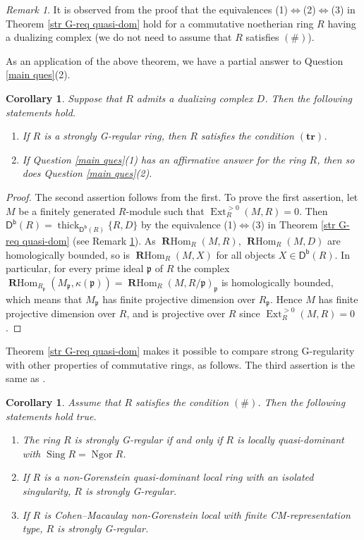\documentclass{amsart}
\newtheorem{cor}[thm]{Corollary}
\theoremstyle{definition}
\theoremstyle{remark}
\newtheorem{rem}[thm]{Remark}
\numberwithin{equation}{thm}
\def\Db{\operatorname{\mathsf{D^b}}}
\def\Ext{\operatorname{Ext}}
\def\ng{\operatorname{Ngor}}
\def\p{\mathfrak{p}}
\def\RHom{\operatorname{\mathbf{R}Hom}}
\def\sing{\operatorname{Sing}}
\def\thick{\operatorname{thick}}
\def\TR{(\mathbf{tr})}
\begin{document}
\begin{rem}\label{12}
It is observed from the proof that the equivalences (1)$\Leftrightarrow$(2)$\Leftrightarrow$(3) in Theorem \ref{str G-req quasi-dom} hold for a commutative noetherian ring $R$ having a dualizing complex (we do not need to assume that $R$ satisfies $(\#)$).
\end{rem}

As an application of the above theorem, we have a partial answer to Question \ref{main ques}(2).

\begin{cor}\label{stgregtr}
Suppose that $R$ admits a dualizing complex $D$.
Then the following statements hold.
\begin{enumerate}[\rm(1)]
\item
If $R$ is a strongly G-regular ring, then $R$ satisfies the condition $\TR$.
\item
If Question \ref{main ques}(1) has an affirmative answer for the ring $R$, then so does Question \ref{main ques}(2).
\end{enumerate}
\end{cor}

\begin{proof}
The second assertion follows from the first.
To prove the first assertion, let $M$ be a finitely generated $R$-module such that $\Ext_R^{>0}(M,R)=0$.
Then $\Db(R)=\thick_{\Db(R)} \{R, D\}$ by the equivalence (1)$\Leftrightarrow$(3) in Theorem \ref{str G-req quasi-dom} (see Remark \ref{12}).
As $\RHom_R(M,R)$, $\RHom_R(M,D)$ are homologically bounded, so is $\RHom_R(M,X)$ for all objects $X\in\Db(R)$.
In particular, for every prime ideal $\p$ of $R$ the complex $\RHom_{R_\p}(M_\p, \kappa(\p))=\RHom_R(M,R/\p)_\p$ is homologically bounded, which means that $M_\p$ has finite projective dimension over $R_\p$.
Hence $M$ has finite projective dimension over $R$, and is projective over $R$ since $\Ext_R^{>0}(M,R)=0$.
\end{proof}

Theorem \ref{str G-req quasi-dom} makes it possible to compare strong G-regularity with other properties of commutative rings, as follows.
The third assertion is the same as \cite[Proposition 5.15]{DKLO25}.

\begin{cor}\label{sgrprprng}
Assume that $R$ satisfies the condition $(\#)$.
Then the following statements hold true.
\begin{enumerate}[\rm(1)]
\item
The ring $R$ is strongly G-regular if and only if $R$ is locally quasi-dominant with $\sing R=\ng R$.
\item
If $R$ is a non-Gorenstein quasi-dominant local ring with an isolated singularity, $R$ is strongly G-regular.
\item
If $R$ is Cohen--Macaulay non-Gorenstein local with finite CM-representation type, $R$ is strongly G-regular.
\end{enumerate}
\end{cor}
\end{document}
